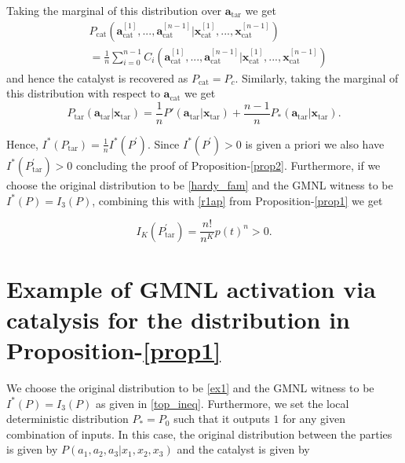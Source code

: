 \documentclass[pra,aps,reprint,superscriptaddress]{revtex4-2}
\theoremstyle{theorem}
\begin{document}
Taking the marginal of this distribution over $\mathbf{a}_{\mathrm{tar}}$ we get
\begin{align}\nonumber
    &P_{\mathrm{cat}}\left( \mathbf{a}^{[1]}_{\mathrm{cat}},...,\mathbf{a}^{[n-1]}_{\mathrm{cat}} \big| \mathbf{x}^{[1]}_{\mathrm{cat}},...,\mathbf{x}^{[n-1]}_{\mathrm{cat}}\right)\\& = \frac{1}{n}\sum_{i=0}^{n-1}C_i\left( \mathbf{a}^{[1]}_{\mathrm{cat}},...,\mathbf{a}^{[n-1]}_{\mathrm{cat}} \big| \mathbf{x}^{[1]}_{\mathrm{cat}},...,\mathbf{x}^{[n-1]}_{\mathrm{cat}}\right)
\end{align}
and hence the catalyst is recovered as $P_{\mathrm{cat}} = P_c$. Similarly, taking the marginal of this distribution with respect to $\mathbf{a}_{\mathrm{cat}}$ we get
\begin{equation}
    P_{\mathrm{tar}}\left(\mathbf{a}_{\mathrm{tar}}|\mathbf{x}_{\mathrm{tar}}\right) = \frac{1}{n}P'\left(\mathbf{a}_{\mathrm{tar}}|\mathbf{x}_{\mathrm{tar}}\right) + \frac{n-1}{n}P_*\left(\mathbf{a}_{\mathrm{tar}}|\mathbf{x}_{\mathrm{tar}}\right).
\end{equation}

Hence, $I^*(P_{\mathrm{tar}})=\frac{1}{n}I^*(P^\prime)$. Since $I^*(P^\prime)>0$ is given a priori we also have $I^*(P^{\prime}_{\mathrm{tar}})>0$ concluding the proof of Proposition-\ref{prop2}. Furthermore, if we choose the original distribution to be \eqref{hardy_fam} and the GMNL witness to be $I^*(P) = I_3(P)$, combining this with \eqref{r1ap} from Proposition-\ref{prop1} we get

\begin{equation}
    I_K(P^{\prime}_{\mathrm{tar}}) = \frac{n!}{n^{K}}p(t)^{n}>0.
\end{equation}

\section{Example of GMNL activation via catalysis for the distribution in Proposition-\ref{prop1}}
\label{app:new_wiring}

 We choose the original distribution to be \eqref{ex1} and the GMNL witness to be $I^*(P) = I_3(P)$ as given in \eqref{top_ineq}. Furthermore, we set the local deterministic distribution $P_*=P_0$ such that it outputs $1$ for any given combination of inputs. In this case, the original distribution between the parties is given by $P(a_1,a_2,a_3|x_1,x_2,x_3)$ and the catalyst is given by
\end{document}
